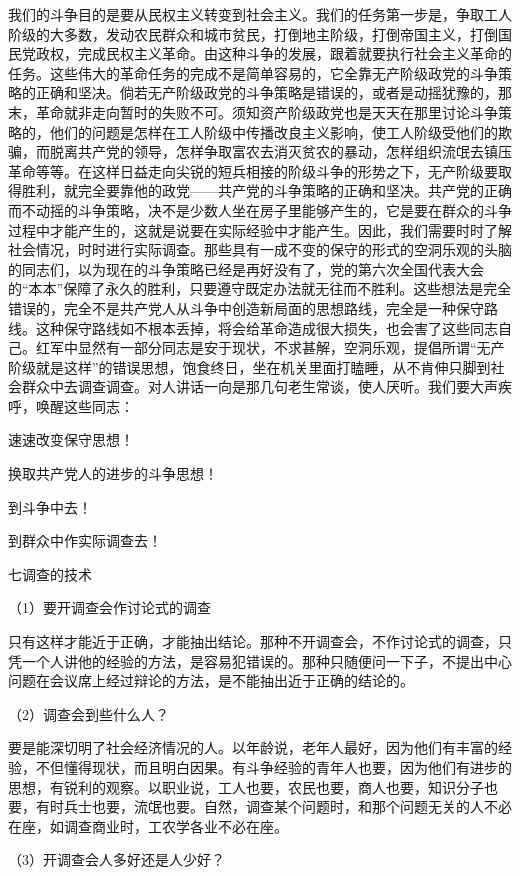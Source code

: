 我们的斗争目的是要从民权主义转变到社会主义。我们的任务第一步是，争取工人阶级的大多数，发动农民群众和城市贫民，打倒地主阶级，打倒帝国主义，打倒国民党政权，完成民权主义革命。由这种斗争的发展，跟着就要执行社会主义革命的任务。这些伟大的革命任务的完成不是简单容易的，它全靠无产阶级政党的斗争策略的正确和坚决。倘若无产阶级政党的斗争策略是错误的，或者是动摇犹豫的，那末，革命就非走向暂时的失败不可。须知资产阶级政党也是天天在那里讨论斗争策略的，他们的问题是怎样在工人阶级中传播改良主义影响，使工人阶级受他们的欺骗，而脱离共产党的领导，怎样争取富农去消灭贫农的暴动，怎样组织流氓去镇压革命等等。在这样日益走向尖锐的短兵相接的阶级斗争的形势之下，无产阶级要取得胜利，就完全要靠他的政党——共产党的斗争策略的正确和坚决。共产党的正确而不动摇的斗争策略，决不是少数人坐在房子里能够产生的，它是要在群众的斗争过程中才能产生的，这就是说要在实际经验中才能产生。因此，我们需要时时了解社会情况，时时进行实际调查。那些具有一成不变的保守的形式的空洞乐观的头脑的同志们，以为现在的斗争策略已经是再好没有了，党的第六次全国代表大会的“本本”保障了永久的胜利，只要遵守既定办法就无往而不胜利。这些想法是完全错误的，完全不是共产党人从斗争中创造新局面的思想路线，完全是一种保守路线。这种保守路线如不根本丢掉，将会给革命造成很大损失，也会害了这些同志自己。红军中显然有一部分同志是安于现状，不求甚解，空洞乐观，提倡所谓“无产阶级就是这样”的错误思想，饱食终日，坐在机关里面打瞌睡，从不肯伸只脚到社会群众中去调查调查。对人讲话一向是那几句老生常谈，使人厌听。我们要大声疾呼，唤醒这些同志：

速速改变保守思想！

换取共产党人的进步的斗争思想！

到斗争中去！

到群众中作实际调查去！

七调查的技术

（1）要开调查会作讨论式的调查

只有这样才能近于正确，才能抽出结论。那种不开调查会，不作讨论式的调查，只凭一个人讲他的经验的方法，是容易犯错误的。那种只随便问一下子，不提出中心问题在会议席上经过辩论的方法，是不能抽出近于正确的结论的。

（2）调查会到些什么人？

要是能深切明了社会经济情况的人。以年龄说，老年人最好，因为他们有丰富的经验，不但懂得现状，而且明白因果。有斗争经验的青年人也要，因为他们有进步的思想，有锐利的观察。以职业说，工人也要，农民也要，商人也要，知识分子也要，有时兵士也要，流氓也要。自然，调查某个问题时，和那个问题无关的人不必在座，如调查商业时，工农学各业不必在座。

（3）开调查会人多好还是人少好？

